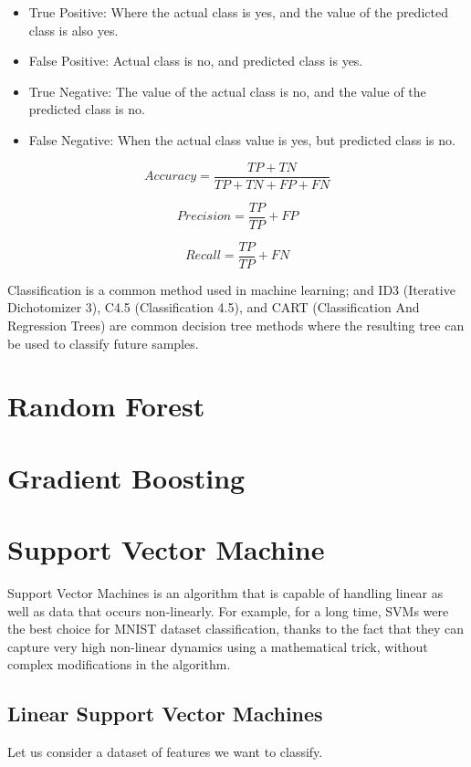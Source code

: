 \documentclass[12pt]{article}
\begin{document}
\begin{itemize}

\item{True Positive}: Where the actual class is yes, and
the value of the predicted class is also yes.

\item{False Positive}: Actual class is no, and predicted
class is yes.

\item{True Negative}: The value of the actual class is no,
and the value of the predicted class is no.

\item{False Negative}: When the actual class value is yes,
but predicted class is no.

\end{itemize}

$$
Accuracy= \frac{TP + TN}{TP + TN + FP + FN}
$$

$$
Precision = \frac{TP}{TP} + FP
$$

$$
Recall = \frac{TP}{TP} + FN
$$

Classification is a common method used in machine learning; and ID3 (Iterative Dichotomizer 3), C4.5 (Classification 4.5), and CART
(Classification And Regression Trees) are common decision tree methods where the resulting tree can be used to classify future samples.
\newpage
\section{Random Forest}

\newpage
\section{Gradient Boosting}

\newpage
\section{Support Vector Machine}
Support Vector Machines is an algorithm that is capable of handling 
linear as well as data that occurs non-linearly. For example, for a long time, SVMs were the best
choice for MNIST dataset classification, thanks to the fact that they can capture very high
non-linear dynamics using a mathematical trick, without complex modifications in the
algorithm.

\subsection{Linear Support Vector Machines}
Let us consider a dataset of features we want to classify.
\end{document}
